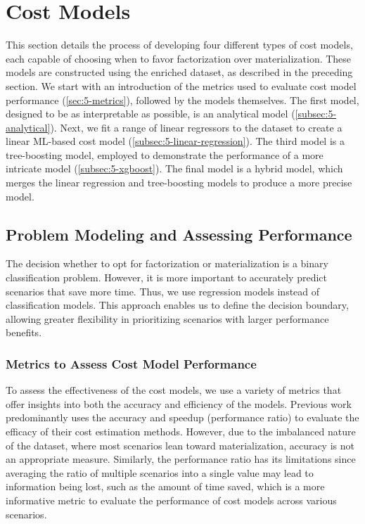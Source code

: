 \section{Cost Models}
\label{sec:5-cost-models}
This section details the process of developing four different types of cost models, each capable of choosing when to favor factorization over materialization. These models are constructed using the enriched dataset, as described in the preceding section. We start with an introduction of the metrics used to evaluate cost model performance (\autoref{sec:5-metrics}), followed by the models themselves. The first model, designed to be as interpretable as possible, is an analytical model (\autoref{subsec:5-analytical}). Next, we fit a range of linear regressors to the dataset to create a linear ML-based cost model (\autoref{subsec:5-linear-regression}). The third model is a tree-boosting model, employed to demonstrate the performance of a more intricate model (\autoref{subsec:5-xgboost}). The final model is a hybrid model, which merges the linear regression and tree-boosting models to produce a more precise model.

\subsection{Problem Modeling and Assessing Performance}
\label{sec:5-metrics}
The decision whether to opt for factorization or materialization is a binary classification problem. However, it is more important to accurately predict scenarios that save more time. Thus, we use regression models instead of classification models. This approach enables us to define the decision boundary, allowing greater flexibility in prioritizing scenarios with larger performance benefits.

\subsubsection{Metrics to Assess Cost Model Performance}
To assess the effectiveness of the cost models, we use a variety of metrics that offer insights into both the accuracy and efficiency of the models. Previous work~\cite{amalur_tkde24,orion_learning_gen_lin_models,MorpheusFI} predominantly uses the accuracy and speedup (performance ratio) to evaluate the efficacy of their cost estimation methods. However, due to the imbalanced nature of the dataset, where most scenarios lean toward materialization, accuracy is not an appropriate measure. Similarly, the performance ratio has its limitations since averaging the ratio of multiple scenarios into a single value may lead to information being lost, such as the amount of time saved, which is a more informative metric to evaluate the performance of cost models across various scenarios.

